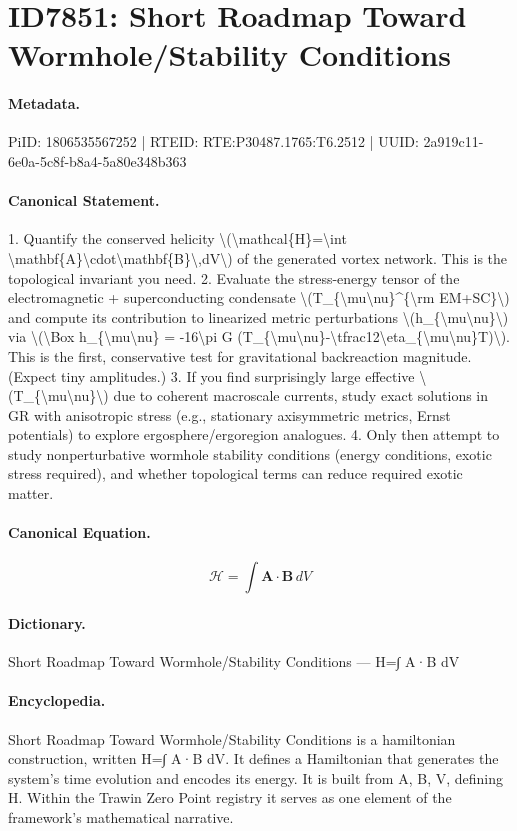 \section*{ID7851: Short Roadmap Toward Wormhole/Stability Conditions}
\paragraph{Metadata.}
PiID: 1806535567252 | RTEID: RTE:P30487.1765:T6.2512 | UUID: 2a919c11-6e0a-5c8f-b8a4-5a80e348b363

\paragraph{Canonical Statement.}
1. Quantify the conserved helicity \textbackslash{}(\textbackslash{}mathcal\{H\}=\textbackslash{}int \textbackslash{}mathbf\{A\}\textbackslash{}cdot\textbackslash{}mathbf\{B\}\textbackslash{},dV\textbackslash{}) of the generated vortex network. This is the topological invariant you need. 2. Evaluate the stress-energy tensor of the electromagnetic + superconducting condensate \textbackslash{}(T\_\{\textbackslash{}mu\textbackslash{}nu\}\textasciicircum{}\{\textbackslash{}rm EM+SC\}\textbackslash{}) and compute its contribution to linearized metric perturbations \textbackslash{}(h\_\{\textbackslash{}mu\textbackslash{}nu\}\textbackslash{}) via \textbackslash{}(\textbackslash{}Box h\_\{\textbackslash{}mu\textbackslash{}nu\} = -16\textbackslash{}pi G (T\_\{\textbackslash{}mu\textbackslash{}nu\}-\textbackslash{}tfrac12\textbackslash{}eta\_\{\textbackslash{}mu\textbackslash{}nu\}T)\textbackslash{}). This is the first, conservative test for gravitational backreaction magnitude. (Expect tiny amplitudes.) 3. If you find surprisingly large effective \textbackslash{}(T\_\{\textbackslash{}mu\textbackslash{}nu\}\textbackslash{}) due to coherent macroscale currents, study exact solutions in GR with anisotropic stress (e.g., stationary axisymmetric metrics, Ernst potentials) to explore ergosphere/ergoregion analogues. 4. Only then attempt to study nonperturbative wormhole stability conditions (energy conditions, exotic stress required), and whether topological terms can reduce required exotic matter.

\paragraph{Canonical Equation.}
\[
\mathcal{H}=\int \mathbf{A}\cdot\mathbf{B}\,dV
\]

\paragraph{Dictionary.}
Short Roadmap Toward Wormhole/Stability Conditions — H=∫ A·B dV

\paragraph{Encyclopedia.}
Short Roadmap Toward Wormhole/Stability Conditions is a hamiltonian construction, written H=∫ A·B dV. It defines a Hamiltonian that generates the system's time evolution and encodes its energy. It is built from A, B, V, defining H. Within the Trawin Zero Point registry it serves as one element of the framework's mathematical narrative.
